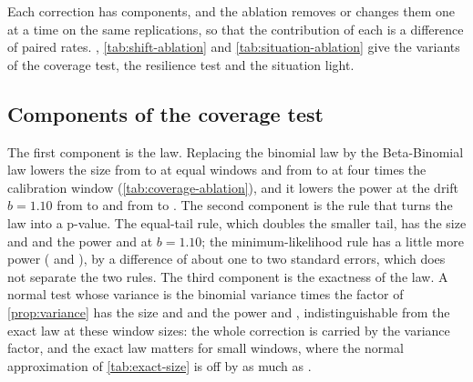 Each correction has components, and the ablation removes or changes them one at a time on the same replications, so that the contribution of each is a difference of paired rates. , \cref{tab:shift-ablation} and \cref{tab:situation-ablation} give the variants of the coverage test, the resilience test and the situation light.

\subsection{Components of the coverage test}



The first component is the law. Replacing the binomial law by the Beta-Binomial law lowers the size from \CovSinBinB{} to \CovSinBBB{} at equal windows and from \CovSinBinC{} to \CovSinBBC{} at four times the calibration window (\cref{tab:coverage-ablation}), and it lowers the power at the drift $b=1.10$ from \CovPowBinBTen{} to \CovPowBBBTen{} and from \CovPowBinCTen{} to \CovPowBBCTen{}. The second component is the rule that turns the law into a p-value. The equal-tail rule, which doubles the smaller tail, has the size \CovSinEqB{} and \CovSinEqC{} and the power \CovPowEqBTen{} and \CovPowEqCTen{} at $b=1.10$; the minimum-likelihood rule has a little more power (\CovPowBBBTen{} and \CovPowBBCTen{}), by a difference of about one to two standard errors, which does not separate the two rules. The third component is the exactness of the law. A normal test whose variance is the binomial variance times the factor of \cref{prop:variance} has the size \CovSinZinfB{} and \CovSinZinfC{} and the power \CovPowZinfBTen{} and \CovPowZinfCTen{}, indistinguishable from the exact law at these window sizes: the whole correction is carried by the variance factor, and the exact law matters for small windows, where the normal approximation of \cref{tab:exact-size} is off by as much as \CovNormalMaxErr{}.

